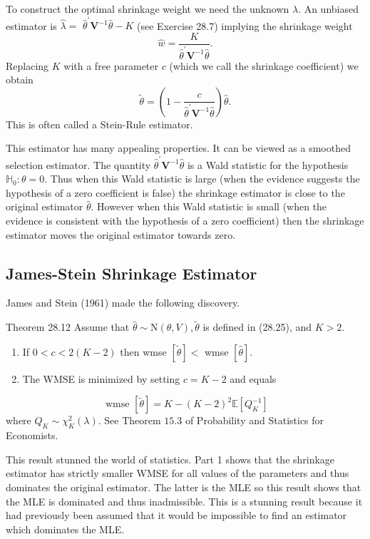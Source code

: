 \documentclass[10pt]{article}
\begin{document}
To construct the optimal shrinkage weight we need the unknown $\lambda$. An unbiased estimator is $\hat{\lambda}=$ $\widehat{\theta}^{\prime} \boldsymbol{V}^{-1} \widehat{\theta}-K$ (see Exercise 28.7) implying the shrinkage weight
$$
\widehat{w}=\frac{K}{\widehat{\theta}^{\prime} \boldsymbol{V}^{-1} \widehat{\theta}} .
$$
Replacing $K$ with a free parameter $c$ (which we call the shrinkage coefficient) we obtain
$$
\widetilde{\theta}=\left(1-\frac{c}{\widehat{\theta}^{\prime} \boldsymbol{V}^{-1} \widehat{\theta}}\right) \widehat{\theta} .
$$
This is often called a Stein-Rule estimator.

This estimator has many appealing properties. It can be viewed as a smoothed selection estimator. The quantity $\widehat{\theta}^{\prime} \boldsymbol{V}^{-1} \widehat{\theta}$ is a Wald statistic for the hypothesis $\mathbb{H}_{0}: \theta=0$. Thus when this Wald statistic is large (when the evidence suggests the hypothesis of a zero coefficient is false) the shrinkage estimator is close to the original estimator $\widehat{\theta}$. However when this Wald statistic is small (when the evidence is consistent with the hypothesis of a zero coefficient) then the shrinkage estimator moves the original estimator towards zero.

\subsection{James-Stein Shrinkage Estimator}
James and Stein (1961) made the following discovery.

Theorem 28.12 Assume that $\widehat{\theta} \sim \mathrm{N}(\theta, V), \widetilde{\theta}$ is defined in (28.25), and $K>2$.

\begin{enumerate}
  \item If $0<c<2(K-2)$ then wmse $[\widetilde{\theta}]<$ wmse $[\widehat{\theta}]$.

  \item The WMSE is minimized by setting $c=K-2$ and equals

\end{enumerate}
$$
\text { wmse }[\widetilde{\theta}]=K-(K-2)^{2} \mathbb{E}\left[Q_{K}^{-1}\right]
$$
where $Q_{K} \sim \chi_{K}^{2}(\lambda)$. See Theorem $15.3$ of Probability and Statistics for Economists.

This result stunned the world of statistics. Part 1 shows that the shrinkage estimator has strictly smaller WMSE for all values of the parameters and thus dominates the original estimator. The latter is the MLE so this result shows that the MLE is dominated and thus inadmissible. This is a stunning result because it had previously been assumed that it would be impossible to find an estimator which dominates the MLE.
\end{document}
